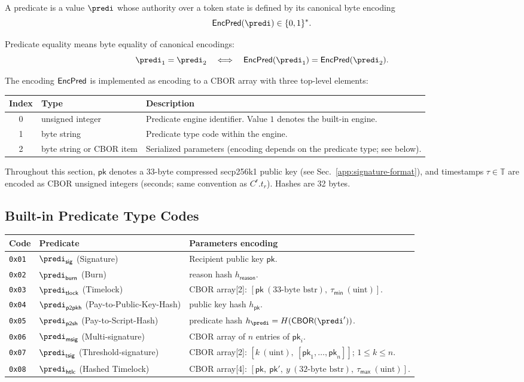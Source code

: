 A predicate is a value $\predi$ whose authority over a token state is defined by its canonical byte encoding
\[
\encpred(\predi) \in \{0,1\}^* .
\]

Predicate equality means byte equality of canonical encodings:
\[
\predi_1 = \predi_2 \quad\Longleftrightarrow\quad
\encpred(\predi_1) = \encpred(\predi_2).
\]

The encoding $\mathsf{EncPred}$ is implemented as encoding to a CBOR array with three top-level elements:

\begin{longtable}{clp{8cm}}
\textbf{Index} & \textbf{Type} & \textbf{Description} \\
\hline
0 & unsigned integer & Predicate engine identifier. Value $1$ denotes the built-in engine. \\
1 & byte string & Predicate type code within the engine. \\
2 & byte string or CBOR item & Serialized parameters (encoding depends on the predicate type; see below). \\
\end{longtable}

\noindent Throughout this section, $\mathsf{pk}$ denotes a 33-byte compressed secp256k1 public key (see Sec.~\ref{app:signature-format}), and timestamps $\tau \in \mathbb{T}$ are encoded as CBOR unsigned integers (seconds; same convention as $C^\mathsf{r}.t_r$). Hashes are 32 bytes.

\subsection{Built-in Predicate Type Codes}

\begin{longtable}{llp{10cm}}
\textbf{Code} & \textbf{Predicate} & \textbf{Parameters encoding} \\
\hline
\endhead
\texttt{0x01} & $\predi_\mathsf{sig}$ (Signature) & Recipient public key $\mathsf{pk}$. \\
\texttt{0x02} & $\predi_\mathsf{burn}$ (Burn) & reason hash $h_\mathsf{reason}$. \\
\texttt{0x03} & $\predi_\mathsf{tlock}$ (Timelock) & CBOR array[2]: $[\mathsf{pk}\ (33\text{-byte bstr}),\ \tau_\mathsf{min}\ (\text{uint})]$. \\
\texttt{0x04} & $\predi_\mathsf{p2pkh}$ (Pay-to-Public-Key-Hash) & public key hash $h_\mathsf{pk}$. \\
\texttt{0x05} & $\predi_\mathsf{p2sh}$ (Pay-to-Script-Hash) & predicate hash $h_\predi = H(\mathsf{CBOR}(\predi'))$. \\
\texttt{0x06} & $\predi_\mathsf{msig}$ (Multi-signature) & CBOR array of $n$ entries of $\mathsf{pk}_i$. \\
\texttt{0x07} & $\predi_\mathsf{tsig}$ (Threshold-signature) & CBOR array[2]: $[k\ (\text{uint}),\ [\mathsf{pk}_1,\ldots,\mathsf{pk}_n]]$; $1 \le k \le n$. \\
\texttt{0x08} & $\predi_\mathsf{htlc}$ (Hashed Timelock) & CBOR array[4]: $[\mathsf{pk},\ \mathsf{pk}',\ y\ (32\text{-byte bstr}),\ \tau_\mathsf{max}\ (\text{uint})]$. \\
\end{longtable}

